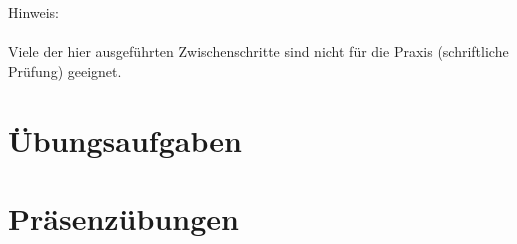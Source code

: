 \documentclass[
]{scrreprt}
\newcounter{tc}
\begin{document}



\tableofcontents

\newpage

Hinweis: \\~\\ Viele der hier ausgeführten Zwischenschritte sind nicht für die Praxis (schriftliche Prüfung) geeignet.

\newpage

\chapter*{Übungsaufgaben}





%
%
%
%
%

\newpage

\setcounter{chapter}{0}

\chapter*{Präsenzübungen}






	
\end{document}
